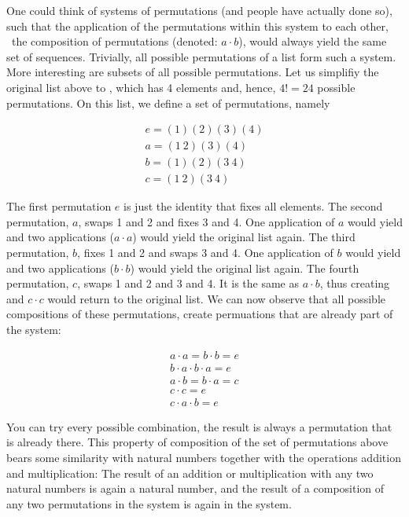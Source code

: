 \documentclass{scrreprt}
\newcommand{\texfamily}{\fontfamily{cmtex}\selectfont}
\begin{document}
One could think 
of systems of permutations
(and people have actually done so),
such
that the application of the permutations within this system
to each other,
\ie\ the composition of permutations (denoted: $a \cdot b$),
would always yield the same set of sequences.
Trivially, all possible permutations of a list form such a system.
More interesting are subsets of all possible permutations.
Let us simplifiy the original list above to \text{\texfamily [1,2,3,4]},
which has 4 elements and, hence, $4!=24$ possible permutations.
On this list, we define a set of permutations, namely

\begin{eqnarray}
e = (1)(2)(3)(4)\\
a = (1~2)(3)(4)\\
b = (1)(2)(3~4)\\
c = (1~2)(3~4)
\end{eqnarray}

The first permutation $e$ is just the identity that fixes all elements.
The second permutation, $a$, swaps 1 and 2 and fixes 3 and 4.
One application of $a$ would yield \text{\texfamily [2,1,3,4]}
and two applications ($a \cdot a$) would yield the original list again.
The third permutation, $b$, fixes 1 and 2 and swaps 3 and 4.
One application of $b$ would yield \text{\texfamily [1,2,4,3]}
and two applications ($b \cdot b$) would yield the original list again.
The fourth permutation, $c$, swaps 1 and 2 and 3 and 4.
It is the same as $a \cdot b$, thus creating \text{\texfamily [2,1,4,3]}
and $c \cdot c$ would return to the original list.
We can now observe that all possible compositions of these permutations,
create permuations that are already part of the system:

\begin{eqnarray*}
a \cdot a = b \cdot b = e\\
b \cdot a \cdot b \cdot a = e\\
a \cdot b = b \cdot a = c\\
c \cdot c = e\\
c \cdot a \cdot b = e
\end{eqnarray*}

You can try every possible combination,
the result is always a permutation
that is already there.
This property of composition
of the set of permutations above bears some similarity 
with natural numbers together with
the operations addition and multiplication:
The result of an addition or multiplication
with any two natural numbers 
is again a natural number,
and the result of a composition
of any two permutations in the system
is again in the system.
\end{document}
